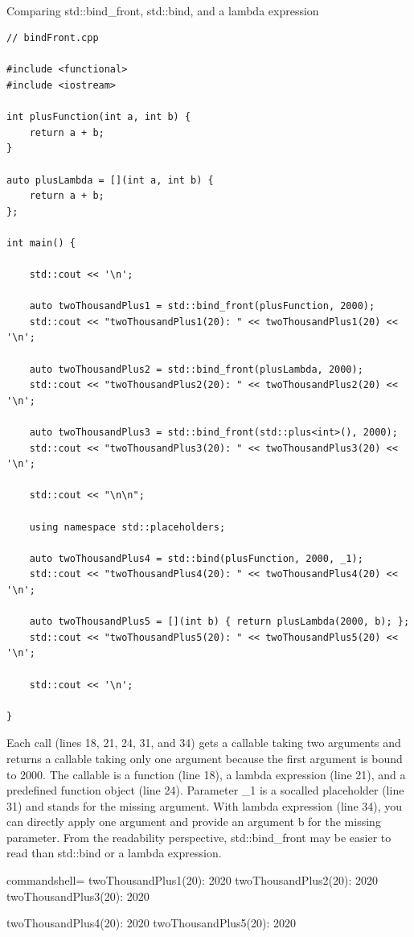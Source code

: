 \hspace*{\fill} \\ %
\noindent
Comparing std::bind\_front, std::bind, and a lambda expression
\begin{lstlisting}[style=styleCXX]
// bindFront.cpp

#include <functional>
#include <iostream>

int plusFunction(int a, int b) {
	return a + b;
}

auto plusLambda = [](int a, int b) {
	return a + b;
};

int main() {

	std::cout << '\n';
	
	auto twoThousandPlus1 = std::bind_front(plusFunction, 2000);
	std::cout << "twoThousandPlus1(20): " << twoThousandPlus1(20) << '\n';
	
	auto twoThousandPlus2 = std::bind_front(plusLambda, 2000);
	std::cout << "twoThousandPlus2(20): " << twoThousandPlus2(20) << '\n';
	
	auto twoThousandPlus3 = std::bind_front(std::plus<int>(), 2000);
	std::cout << "twoThousandPlus3(20): " << twoThousandPlus3(20) << '\n';
	
	std::cout << "\n\n";
	
	using namespace std::placeholders;
	
	auto twoThousandPlus4 = std::bind(plusFunction, 2000, _1);
	std::cout << "twoThousandPlus4(20): " << twoThousandPlus4(20) << '\n';
	
	auto twoThousandPlus5 = [](int b) { return plusLambda(2000, b); };
	std::cout << "twoThousandPlus5(20): " << twoThousandPlus5(20) << '\n';
	
	std::cout << '\n';

}
\end{lstlisting}

Each call (lines 18, 21, 24, 31, and 34) gets a callable taking two arguments and returns a callable taking only one argument because the first argument is bound to 2000. The callable is a function (line 18), a lambda expression (line 21), and a predefined function object (line 24). Parameter \_1 is a socalled placeholder (line 31) and stands for the missing argument. With lambda expression (line 34), you can directly apply one argument and provide an argument b for the missing parameter. From the readability perspective, std::bind\_front may be easier to read than std::bind or a lambda expression.

\begin{tcblisting}{commandshell={}}
twoThousandPlus1(20): 2020
twoThousandPlus2(20): 2020
twoThousandPlus3(20): 2020

twoThousandPlus4(20): 2020
twoThousandPlus5(20): 2020
\end{tcblisting}

